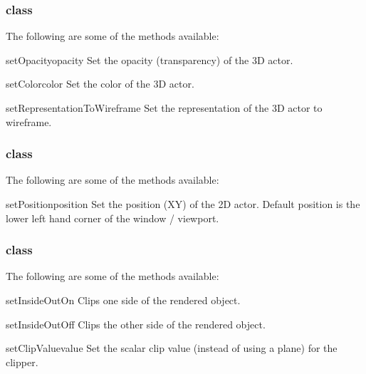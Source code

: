 \subsubsection{\ActorThreeD class}

The following are some of the methods available:

\begin{methoddesc}[Actor3D]{setOpacity}{opacity}
Set the opacity (transparency) of the 3D actor.
\end{methoddesc}

\begin{methoddesc}[Actor3D]{setColor}{color}
Set the color of the 3D actor.
\end{methoddesc}

\begin{methoddesc}[Actor3D]{setRepresentationToWireframe}{}
Set the representation of the 3D actor to wireframe.
\end{methoddesc}

\subsubsection{\ActorTwoD class}

The following are some of the methods available:

\begin{methoddesc}[Actor2D]{setPosition}{position}
Set the position (XY) of the 2D actor. Default position is the lower left hand
corner of the window / viewport.
\end{methoddesc}

\subsubsection{\Clipper class}

The following are some of the methods available:

\begin{methoddesc}[Clipper]{setInsideOutOn}{}
Clips one side of the rendered object.
\end{methoddesc}

\begin{methoddesc}[Clipper]{setInsideOutOff}{}
Clips the other side of the rendered object.
\end{methoddesc}

\begin{methoddesc}[Clipper]{setClipValue}{value}
Set the scalar clip value (instead of using a plane) for the clipper.
\end{methoddesc}

